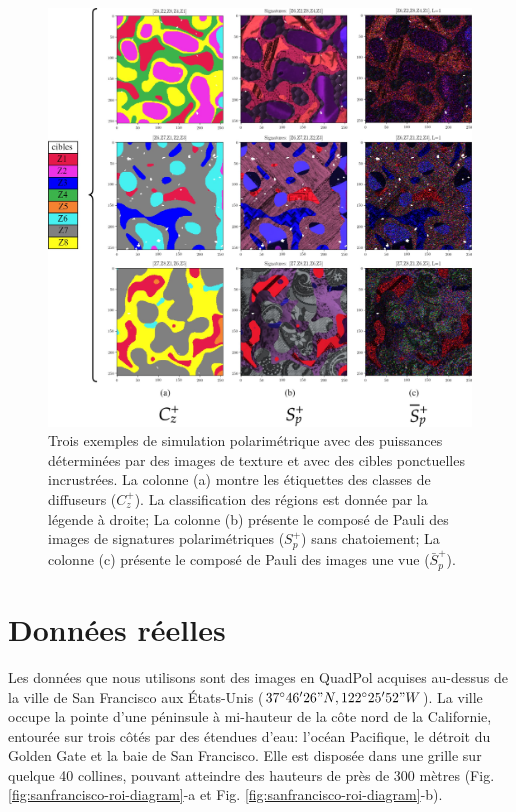 \begin{figure}
  \includegraphics[width=1.0\linewidth]{figures/Chap3/polsar_simulation_examples.jpg}
  \centering
  \caption{
  \small{Trois exemples de simulation polarimétrique avec des puissances déterminées par des images de texture et avec des cibles ponctuelles incrustrées. La colonne (a) montre les étiquettes des classes de diffuseurs ($C_z^+$). La classification \halpha des régions est donnée par la légende à droite; La colonne (b) présente le composé de Pauli des images de signatures polarimétriques ($S_p^+$) sans chatoiement; La colonne (c) présente le composé de Pauli des images une vue ($\bar{S}_p^+$). }
  }
  \label{fig:polsar_simulation_examples}
\end{figure}

\section{Données réelles} \label{section:données_réelles}

Les données que nous utilisons sont des images en QuadPol acquises au-dessus de la ville de San Francisco aux États-Unis  ($37^\circ 46' 26" N, 122^\circ 25' 52" W$). La ville occupe la pointe d'une péninsule à mi-hauteur de la côte nord de la Californie, entourée sur trois côtés par des étendues d'eau: l'océan Pacifique, le détroit du Golden Gate et la baie de San Francisco. Elle est disposée dans une grille sur quelque 40 collines, pouvant atteindre des hauteurs de près de 300 mètres  (Fig. \ref{fig:sanfrancisco-roi-diagram}-a et Fig. \ref{fig:sanfrancisco-roi-diagram}-b).



